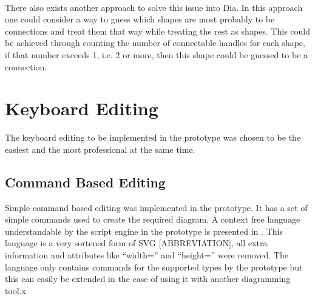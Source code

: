 \begin{itemize}
\paragraph{}
There also exists another approach to solve this issue into Dia. In this approach one could consider a way to guess which shapes are most probably to be connections and treat them that way while treating the rest as shapes. This could be achieved through counting the number of connectable handles for each shape, if that number exceeds 1, i.e. 2 or more, then this shape could be guessed to be a connection.
\end{itemize}


\section{Keyboard Editing}
The keyboard editing to be implemented in the prototype was chosen to be the easiest and the most professional at the same time. 
\subsection{Command Based Editing}
Simple command based editing was implemented in the prototype. It has a set of simple commands used to create the required diagram. A context free language understandable by the script engine in the prototype is presented in . This language is a very sortened form of SVG [ABBREVIATION], all extra information and attributes like ``width='' and ``height='' were removed. The language only contains commands for the supported types by the prototype but this can easily be extended in the case of using it with another diagramming tool.x

